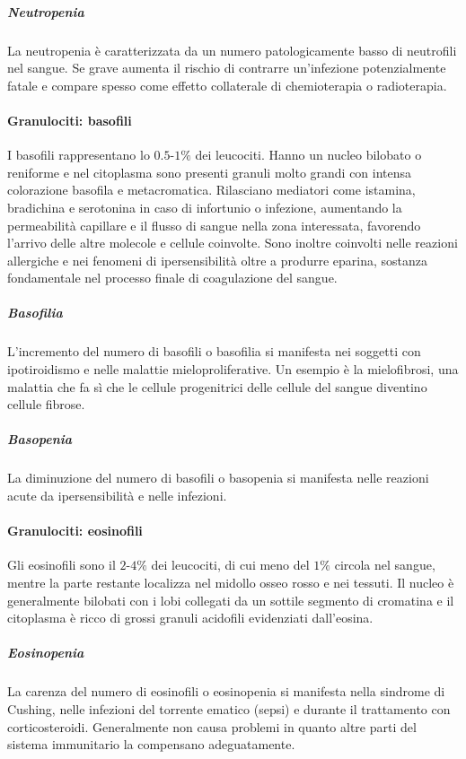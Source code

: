 				\subparagraph{Neutropenia}
				La neutropenia \`e caratterizzata da un numero patologicamente basso di neutrofili nel sangue.
				Se grave aumenta il rischio di contrarre un'infezione potenzialmente fatale e compare spesso come effetto collaterale di chemioterapia o radioterapia.

			\paragraph{Granulociti: basofili}
			I basofili rappresentano lo $0.5$-$1\%$ dei leucociti. 
			Hanno un nucleo bilobato o reniforme e nel citoplasma sono presenti granuli molto grandi con intensa colorazione basofila e metacromatica.
			Rilasciano mediatori come istamina, bradichina e serotonina in caso di infortunio o infezione, aumentando la permeabilit\`a capillare e il flusso di sangue nella zona interessata, favorendo l'arrivo delle altre molecole e cellule coinvolte.
			Sono inoltre coinvolti nelle reazioni allergiche e nei fenomeni di ipersensibilit\`a oltre a produrre eparina, sostanza fondamentale nel processo finale di coagulazione del sangue.


				\subparagraph{Basofilia}
				L'incremento del numero di basofili o basofilia si manifesta nei soggetti con ipotiroidismo e nelle malattie mieloproliferative. 
				Un esempio \`e la mielofibrosi, una malattia che fa s\`i che le cellule progenitrici delle cellule del sangue diventino cellule fibrose.

				\subparagraph{Basopenia}
				La diminuzione del numero di basofili o basopenia si manifesta nelle reazioni acute da ipersensibilit\`a e nelle infezioni.

			\paragraph{Granulociti: eosinofili}
			Gli eosinofili sono il $2$-$4\%$ dei leucociti, di cui meno del $1\%$ circola nel sangue, mentre la parte restante localizza nel midollo osseo rosso e nei tessuti.
			Il nucleo \`e generalmente bilobati con i lobi collegati da un sottile segmento di cromatina e il citoplasma \`e ricco di grossi granuli acidofili evidenziati dall'eosina. 

				\subparagraph{Eosinopenia}
				La carenza del numero di eosinofili o eosinopenia si manifesta nella sindrome di Cushing, nelle infezioni del torrente ematico (sepsi) e durante il trattamento con corticosteroidi. 
				Generalmente non causa problemi in quanto altre parti del sistema immunitario la compensano adeguatamente.


